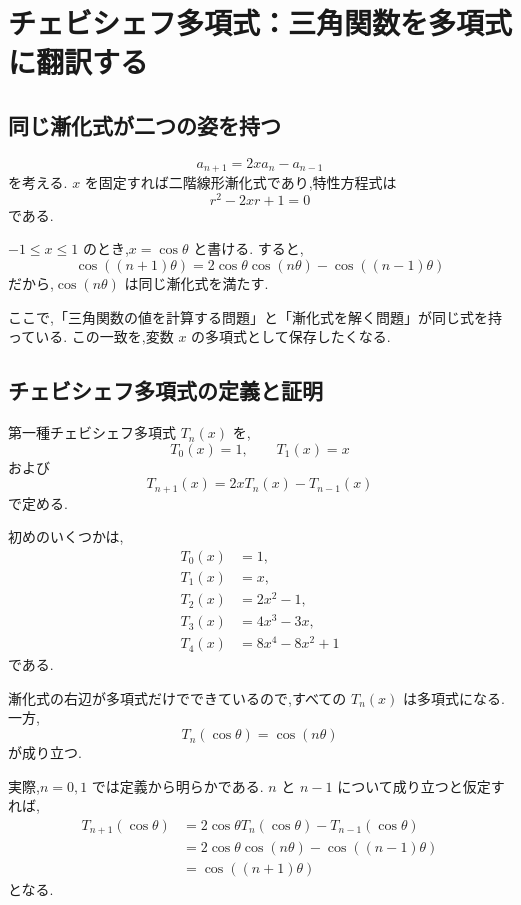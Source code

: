 
\section{チェビシェフ多項式：三角関数を多項式に翻訳する}\label{節：チェビシェフ多項式：三角関数を多項式に翻訳する}

\subsection{同じ漸化式が二つの姿を持つ}

\[
  a_{n+1}=2x a_n-a_{n-1}
\]
を考える.
$x$ を固定すれば二階線形漸化式であり,特性方程式は
\[
  r^2-2xr+1=0
\]
である.

$-1\leq x\leq1$ のとき,$x=\cos\theta$ と書ける.
すると,
\[
  \cos((n+1)\theta)
  =
  2\cos\theta\cos(n\theta)-\cos((n-1)\theta)
\]
だから,$\cos(n\theta)$ は同じ漸化式を満たす.

ここで,「三角関数の値を計算する問題」と「漸化式を解く問題」が同じ式を持っている.
この一致を,変数 $x$ の多項式として保存したくなる.

\subsection{チェビシェフ多項式の定義と証明}

第一種チェビシェフ多項式 $T_n(x)$ を,
\[
  T_0(x)=1,\qquad T_1(x)=x
\]
および
\[
  T_{n+1}(x)=2xT_n(x)-T_{n-1}(x)
\]
で定める.

初めのいくつかは,
\[
  \begin{aligned}
    T_0(x) & =1,          \\
    T_1(x) & =x,          \\
    T_2(x) & =2x^2-1,     \\
    T_3(x) & =4x^3-3x,    \\
    T_4(x) & =8x^4-8x^2+1
  \end{aligned}
\]
である.

漸化式の右辺が多項式だけでできているので,すべての $T_n(x)$ は多項式になる.
一方,
\[
  T_n(\cos\theta)=\cos(n\theta)
\]
が成り立つ.

実際,$n=0,1$ では定義から明らかである.
$n$ と $n-1$ について成り立つと仮定すれば,
\[
  \begin{aligned}
    T_{n+1}(\cos\theta)
     & =2\cos\theta T_n(\cos\theta)-T_{n-1}(\cos\theta) \\
     & =2\cos\theta\cos(n\theta)-\cos((n-1)\theta)      \\
     & =\cos((n+1)\theta)
  \end{aligned}
\]
となる.

